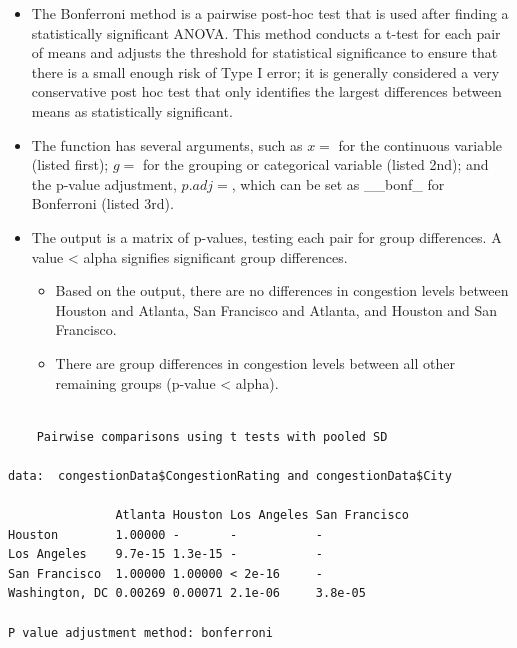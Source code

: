 \documentclass[
  letterpaper,
  DIV=11,
  numbers=noendperiod]{scrreprt}
\newenvironment{Shaded}{\begin{snugshade}}{\end{snugshade}}
\newcommand{\AttributeTok}[1]{\textcolor[rgb]{0.40,0.45,0.13}{#1}}
\newcommand{\FunctionTok}[1]{\textcolor[rgb]{0.28,0.35,0.67}{#1}}
\newcommand{\NormalTok}[1]{\textcolor[rgb]{0.00,0.23,0.31}{#1}}
\newcommand{\SpecialCharTok}[1]{\textcolor[rgb]{0.37,0.37,0.37}{#1}}
\newcommand{\StringTok}[1]{\textcolor[rgb]{0.13,0.47,0.30}{#1}}
\providecommand{\tightlist}{%
  \setlength{\itemsep}{0pt}\setlength{\parskip}{0pt}}\usepackage{longtable,booktabs,array}
\begin{document}
\begin{itemize}
\tightlist
\item
  The Bonferroni method is a pairwise post-hoc test that is used after
  finding a statistically significant ANOVA. This method conducts a
  t-test for each pair of means and adjusts the threshold for
  statistical significance to ensure that there is a small enough risk
  of Type I error; it is generally considered a very conservative post
  hoc test that only identifies the largest differences between means as
  statistically significant.
\item
  The function has several arguments, such as \(x =\) for the continuous
  variable (listed first); \(g =\) for the grouping or categorical
  variable (listed 2nd); and the p-value adjustment, \(p.adj =\), which
  can be set as \_\_bonf\_ for Bonferroni (listed 3rd).
\item
  The output is a matrix of p-values, testing each pair for group
  differences. A value \textless{} alpha signifies significant group
  differences.

  \begin{itemize}
  \tightlist
  \item
    Based on the output, there are no differences in congestion levels
    between Houston and Atlanta, San Francisco and Atlanta, and Houston
    and San Francisco.
  \item
    There are group differences in congestion levels between all other
    remaining groups (p-value \textless{} alpha).
  \end{itemize}
\end{itemize}

\begin{Shaded}
\end{Shaded}

\begin{verbatim}

    Pairwise comparisons using t tests with pooled SD 

data:  congestionData$CongestionRating and congestionData$City 

               Atlanta Houston Los Angeles San Francisco
Houston        1.00000 -       -           -            
Los Angeles    9.7e-15 1.3e-15 -           -            
San Francisco  1.00000 1.00000 < 2e-16     -            
Washington, DC 0.00269 0.00071 2.1e-06     3.8e-05      

P value adjustment method: bonferroni 
\end{verbatim}
\end{document}
